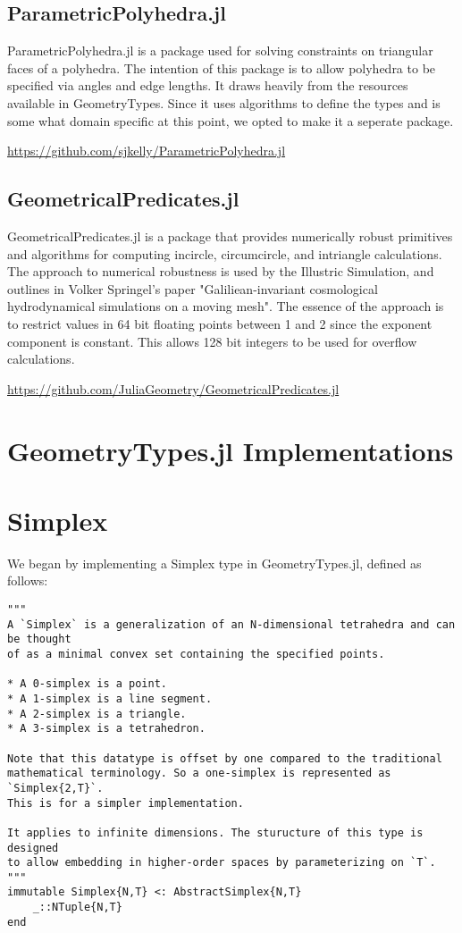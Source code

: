 \subsection{ParametricPolyhedra.jl}

ParametricPolyhedra.jl is a package used for solving constraints on
triangular faces of a polyhedra. The intention of this package
is to allow polyhedra to be specified via angles and edge lengths.
It draws heavily from the resources available in GeometryTypes. Since
it uses algorithms to define the types and is some what domain
specific at this point, we opted to make it a seperate package.

\url{https://github.com/sjkelly/ParametricPolyhedra.jl}

\subsection{GeometricalPredicates.jl}

GeometricalPredicates.jl is a package that provides numerically
robust primitives and algorithms for computing incircle, circumcircle, and
intriangle calculations. The approach to numerical robustness is used by
the Illustric Simulation, and outlines in Volker Springel's paper
"Galiliean-invariant cosmological hydrodynamical simulations on a moving mesh"\cite{Springel_2010}.
The essence of the approach is to restrict values in 64 bit floating points
between 1 and 2 since the exponent component is constant. This allows
128 bit integers to be used for overflow calculations.

\url{https://github.com/JuliaGeometry/GeometricalPredicates.jl}

\section{GeometryTypes.jl Implementations}

\section{Simplex}

We began by implementing a Simplex type in GeometryTypes.jl,
defined as follows:

\begin{lstlisting}
"""
A `Simplex` is a generalization of an N-dimensional tetrahedra and can be thought
of as a minimal convex set containing the specified points.

* A 0-simplex is a point.
* A 1-simplex is a line segment.
* A 2-simplex is a triangle.
* A 3-simplex is a tetrahedron.

Note that this datatype is offset by one compared to the traditional
mathematical terminology. So a one-simplex is represented as `Simplex{2,T}`.
This is for a simpler implementation.

It applies to infinite dimensions. The sturucture of this type is designed
to allow embedding in higher-order spaces by parameterizing on `T`.
"""
immutable Simplex{N,T} <: AbstractSimplex{N,T}
    _::NTuple{N,T}
end
\end{lstlisting}

